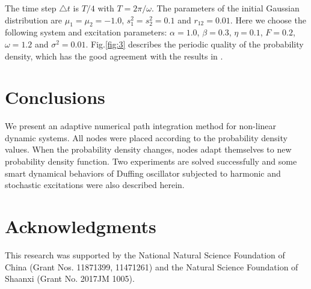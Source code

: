 \documentclass[a4paper, 11pt, final]{article}
\begin{document}
The time step $\triangle t$ is $T/4$
with $T=2\pi/\omega$. The parameters of the initial Gaussian
distribution are $\mu_1=\mu_2=-1.0$, $s_1^2=s_2^2=0.1$ and
$r_{12}=0.01$. Here we choose the following system and
excitation parameters: $\alpha=1.0$, $\beta=0.3$, $\eta=0.1$,
$F=0.2$, $\omega=1.2$ and $\sigma^2=0.01$. 
Fig.\;\ref{fig:3} %
describes the
periodic quality of the probability density, which has the good
agreement with the results in \cite{9}.


\section{Conclusions}

We present an adaptive numerical path integration method for
non-linear dynamic systems. All nodes were placed according
to the probability density values. When the probability density
changes, nodes adapt themselves to new probability density
function. Two experiments are solved successfully and some
smart dynamical behaviors of Duffing oscillator subjected to
harmonic and stochastic excitations were also described herein.

\section*{Acknowledgments}

This research was supported by the National Natural
Science Foundation of China (Grant Nos. 11871399,
11471261) and the Natural Science Foundation of
Shaanxi (Grant No. 2017JM 1005).
\end{document}
